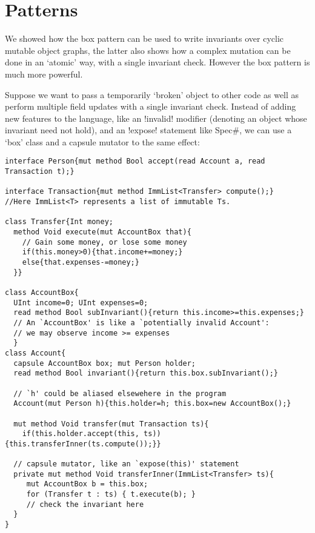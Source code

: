 \section{Patterns}
\label{s:patterns}


We showed how the box pattern can be used to write invariants over cyclic mutable object graphs, the latter also shows how a complex mutation can be done in an `atomic' way, with a single invariant check. However the box pattern is much more powerful.

 Suppose we want to pass a temporarily `broken' object to other code as well as perform multiple field updates with a single invariant check. 
Instead of adding new features to the language, like an \Q!invalid! modifier (denoting an object whose invariant need not hold), and an \Q!expose! statement like Spec\#, we can use a `box' class and a capsule mutator to the same effect:
\begin{lstlisting}
interface Person{mut method Bool accept(read Account a, read Transaction t);}

interface Transaction{mut method ImmList<Transfer> compute();}
//Here ImmList<T> represents a list of immutable Ts.

class Transfer{Int money;
  method Void execute(mut AccountBox that){
    // Gain some money, or lose some money
    if(this.money>0){that.income+=money;}
    else{that.expenses-=money;}
  }}

class AccountBox{
  UInt income=0; UInt expenses=0;
  read method Bool subInvariant(){return this.income>=this.expenses;}
  // An `AccountBox' is like a `potentially invalid Account':
  // we may observe income >= expenses
  }
class Account{
  capsule AccountBox box; mut Person holder;
  read method Bool invariant(){return this.box.subInvariant();}

  // `h' could be aliased elsewehere in the program    
  Account(mut Person h){this.holder=h; this.box=new AccountBox();}

  mut method Void transfer(mut Transaction ts){
    if(this.holder.accept(this, ts)){this.transferInner(ts.compute());}}

  // capsule mutator, like an `expose(this)' statement
  private mut method Void transferInner(ImmList<Transfer> ts){
     mut AccountBox b = this.box;
     for (Transfer t : ts) { t.execute(b); }
     // check the invariant here
  }
}
\end{lstlisting}
